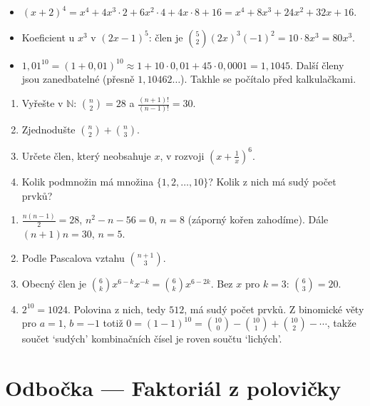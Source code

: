 \begin{example}
  \begin{itemize}
    \item ${(x + 2)}^4 = x^4 + 4x^3\cdot 2 + 6x^2\cdot 4 + 4x\cdot 8 + 16 = x^4 + 8x^3 + 24x^2 + 32x + 16$.
    \item Koeficient u $x^3$ v ${(2x - 1)}^5$: člen je $\binom{5}{2}{(2x)}^3{(-1)}^2 = 10\cdot 8x^3 = 80x^3$.
    \item $1{,}01^{10} = {(1 + 0{,}01)}^{10}\approx 1 + 10\cdot 0{,}01 + 45\cdot 0{,}0001 = 1{,}1045$. Další členy jsou zanedbatelné (přesně $1{,}10462\ldots$). Takhle se počítalo před kalkulačkami.
  \end{itemize}
\end{example}

\begin{problem}
  \begin{enumerate}[label=(\alph*)]
    \item Vyřešte v $\mathbb{N}$: $\binom{n}{2} = 28$ a $\frac{(n + 1)!}{(n - 1)!} = 30$.
    \item Zjednodušte $\binom{n}{2} + \binom{n}{3}$.
    \item Určete člen, který neobsahuje $x$, v rozvoji ${\left(x + \frac{1}{x}\right)}^6$.
    \item Kolik podmnožin má množina $\{1, 2, \ldots, 10\}$? Kolik z nich má sudý počet prvků?
  \end{enumerate}
\end{problem}

\begin{solution}
  \begin{enumerate}[label=(\alph*)]
    \item $\frac{n(n - 1)}{2} = 28$, $n^2 - n - 56 = 0$, $n = 8$ (záporný kořen zahodíme). Dále $(n + 1)n = 30$, $n = 5$.
    \item Podle Pascalova vztahu $\binom{n + 1}{3}$.
    \item Obecný člen je $\binom{6}{k}x^{6-k}x^{-k} = \binom{6}{k}x^{6 - 2k}$. Bez $x$ pro $k = 3$: $\binom{6}{3} = 20$.
    \item $2^{10} = 1024$. Polovina z nich, tedy $512$, má sudý počet prvků. Z binomické věty pro $a = 1$, $b = -1$ totiž $0 = {(1 - 1)}^{10} = \binom{10}{0} - \binom{10}{1} + \binom{10}{2} - \cdots$, takže součet `sudých' kombinačních čísel je roven součtu `lichých'.
  \end{enumerate}
\end{solution}

\section{Odbočka --- Faktoriál z polovičky}

